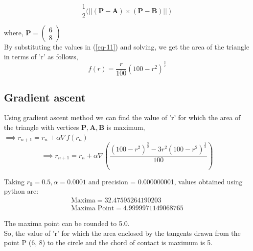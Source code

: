 \documentclass[journal,10.75pt,twocolumn]{IEEEtran}
\newcommand{\myvec}[1]{\ensuremath{\begin{pmatrix}#1\end{pmatrix}}}
\let\vec\mathbf
\begin{document}
\begin{equation}
	\frac{1}{2} (\left ||(\vec{P-A})\times(\vec{P-B})|| \right) \label{eq-11}
\end{equation}
\vspace{0.2cm}

where, $\vec{P} = \myvec{6 \\ 8}$
\\

By substituting the values in (\ref{eq-11}) and solving, we get the area of the triangle in terms of 'r' as follows,
\\
\begin{equation}
f(r) = \frac{r}{100} (100 - r^2)^{\frac{3}{2}}  \label{eq-12}
\end{equation}

\subsection{\textbf{Gradient ascent}}
Using gradient ascent method we can find the value of 'r' for which the area of the triangle with vertices $\vec{P},\vec{A},\vec{B}$ is maximum,
\\

$\implies r_{n+1} = r_n + \alpha \nabla f(r_n) $\\
\begin{equation*}
    \implies r_{n+1}=r_n+\alpha \nabla(\frac{(100-r^2)^{\frac{3}{2}}-3r^2(100-r^2)^{\frac{1}{2}}}{100})
\end{equation*}

\vspace{0.2cm}

Taking $r_0=0.5,\alpha=0.0001$ and precision = 0.000000001, values obtained using python are:
    \begin{align}
        \boxed{\text{Maxima} = 32.47595264190203}\\
        \boxed{\text{Maxima Point} = 4.9999971149068765}
    \end{align}

\vspace{0.2cm}

The maxima point can be rounded to 5.0.
\\
So, the value of 'r' for which the area enclosed by the tangents drawn from the point P (6, 8) to the circle and the chord of contact is maximum is 5.
\end{document}
